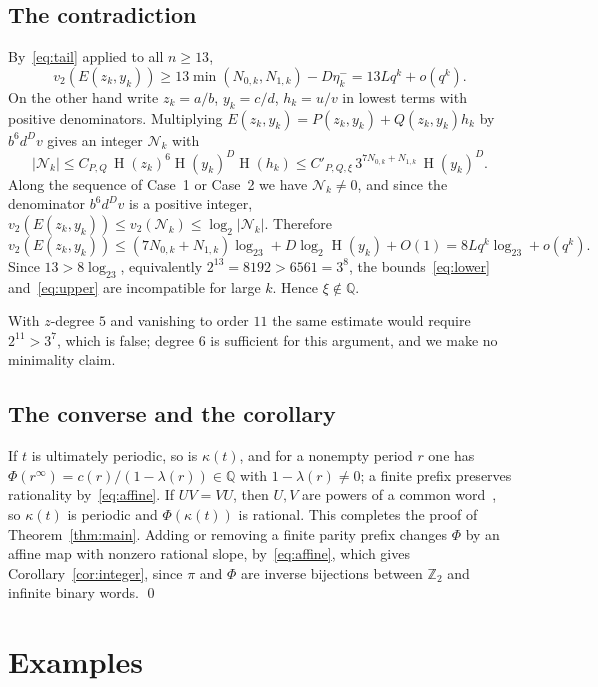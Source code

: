 \documentclass[11pt]{amsart}
\theoremstyle{remark}
\theoremstyle{definition}
\numberwithin{equation}{section}
\newcommand{\Q}{\mathbb{Q}}
\newcommand{\Z}{\mathbb{Z}}
\newcommand{\Ht}{\operatorname{H}}
\newcommand{\vt}{v_2}
\begin{document}
\subsection{The contradiction}
By~\eqref{eq:tail} applied to all $n\ge13$,
\begin{equation}\label{eq:lower}
\vt(E(z_k,y_k))\ge13\min(N_{0,k},N_{1,k})-D\eta_k^-=13Lq^k+o(q^k).
\end{equation}
On the other hand write $z_k=a/b$, $y_k=c/d$, $h_k=u/v$ in lowest terms with positive denominators. Multiplying $E(z_k,y_k)=P(z_k,y_k)+Q(z_k,y_k)h_k$ by $b^6d^Dv$ gives an integer $\mathcal N_k$ with
\[
|\mathcal N_k|\le C_{P,Q}\,\Ht(z_k)^6\Ht(y_k)^D\Ht(h_k)\le C'_{P,Q,\xi}\,3^{7N_{0,k}+N_{1,k}}\,\Ht(y_k)^D .
\]
Along the sequence of Case~1 or Case~2 we have $\mathcal N_k\ne0$, and since the denominator $b^6d^Dv$ is a positive integer, $\vt(E(z_k,y_k))\le\vt(\mathcal N_k)\le\log_2|\mathcal N_k|$. Therefore
\begin{equation}\label{eq:upper}
\vt(E(z_k,y_k))\le(7N_{0,k}+N_{1,k})\log_23+D\log_2\Ht(y_k)+O(1)=8Lq^k\log_23+o(q^k).
\end{equation}
Since $13>8\log_23$, equivalently $2^{13}=8192>6561=3^8$, the bounds~\eqref{eq:lower} and~\eqref{eq:upper} are incompatible for large $k$. Hence $\xi\notin\Q$.

With $z$-degree $5$ and vanishing to order $11$ the same estimate would require $2^{11}>3^7$, which is false; degree $6$ is sufficient for this argument, and we make no minimality claim.

\subsection{The converse and the corollary}
If $t$ is ultimately periodic, so is $\kappa(t)$, and for a nonempty period $r$ one has $\Phi(r^\infty)=c(r)/(1-\lambda(r))\in\Q$ with $1-\lambda(r)\ne0$; a finite prefix preserves rationality by~\eqref{eq:affine}. If $UV=VU$, then $U,V$ are powers of a common word~\cite[Chapter~1]{Lothaire}, so $\kappa(t)$ is periodic and $\Phi(\kappa(t))$ is rational. This completes the proof of Theorem~\ref{thm:main}. Adding or removing a finite parity prefix changes $\Phi$ by an affine map with nonzero rational slope, by~\eqref{eq:affine}, which gives Corollary~\ref{cor:integer}, since $\pi$ and $\Phi$ are inverse bijections between $\Z_2$ and infinite binary words. \qed

\section{Examples}\label{sec:examples}
\end{document}
